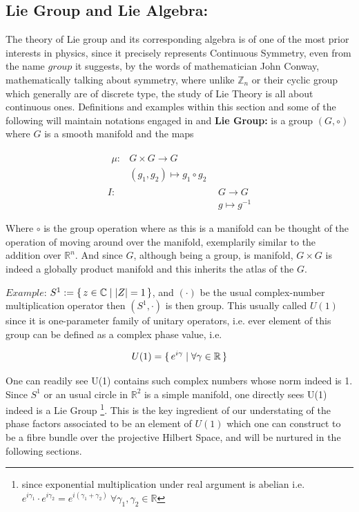 \documentclass[8pt, twocoloumn]{article}
\begin{document}
 \subsection{Lie Group and Lie Algebra:}
 The theory of Lie group and its corresponding algebra is of one of the most prior interests in physics, since it precisely represents Continuous Symmetry, even from the name $group$ it suggests, by the words of mathematician John Conway, mathematically talking about symmetry, where unlike $\mathbb{Z}_n$ or their cyclic group which generally are of discrete type, the study of Lie Theory is all about continuous ones. Definitions and examples within this section and some of the following will maintain notations engaged in \cite{geomanatomy} and \cite{doeslie}
 \textbf{Lie Group:} is a group $(G, \circ)$ where $G$ is a smooth manifold and the maps 
 
 \begin{align}
     \begin{split}
         \mu:& G \times G \to G \\
         & (g_1, g_2) \mapsto g_1 \circ g_2
     \end{split} \\
     I:& G \to G \\
     & g \mapsto g^{-1}
 \end{align}
 
 Where $\circ$ is the group operation where as this is a manifold can be thought of the operation of moving around over the manifold, exemplarily similar to the addition over $\mathbb{R}^n$. And since $G$, although being a group, is manifold, $G\times G$ is indeed a globally product manifold and this inherits the atlas of the $G$. 
 
 $Example$: $S^1 := \set{z \in \mathbb{C}| |Z| = 1}$, and $(\cdot)$ be the usual complex-number multiplication operator then $(S^1, \cdot)$ is then group. This usually called $U(1)$ since it is one-parameter family of unitary operators, i.e. ever element of this group can be defined as a complex phase value, i.e. 
 
 \begin{align}
 U(1) = \set{e^{ i\gamma }| \forall \gamma \in \mathbb{R}}
 \end{align}
 
 One can readily see U(1) contains such complex numbers whose norm indeed is 1. Since $S^1$ or an usual circle in $\mathbb{R}^2$ is a simple manifold, one directly sees U(1) indeed is a Lie Group \footnote{since exponential multiplication under real argument is abelian i.e. $e^{ i\gamma_1} \cdot e^{ i\gamma_2} = e^{ i(\gamma_1+\gamma_2)} \ \forall  \gamma_1, \gamma_2 \in \mathbb{R}$}. This is the key ingredient of our understating of the phase factors associated to be an element of $U(1)$ which one can construct to be a fibre bundle over the projective Hilbert Space, and will be nurtured in the following sections.
 
\end{document}
